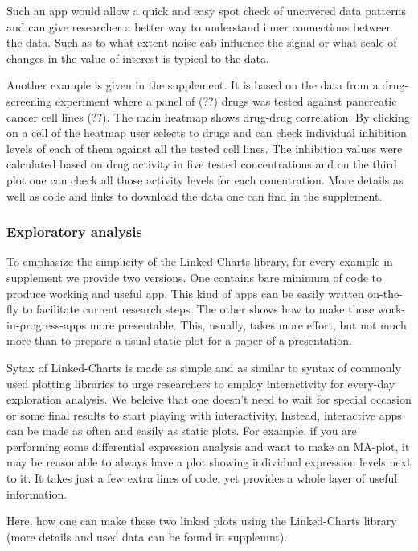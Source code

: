 \documentclass[twocolumn,10pt]{article}
\begin{document}
Such an app would allow a quick and easy spot check of uncovered data patterns and can give researcher a better way to understand inner connections between the data. Such as to what extent noise cab influence the signal or what scale of changes in the value of interest is typical to the data.

Another example is given in the supplement. It is based on the data from a drug-screening experiment where a panel of (??) drugs was tested against pancreatic cancer cell lines (??). The main heatmap shows drug-drug correlation. By clicking on a cell of the heatmap user selects to drugs and can check individual inhibition levels of each of them against all the tested cell lines. The inhibition values were calculated based on drug activity in five tested concentrations and on the third plot one can check all those activity levels for each conentration. More details as well as code and links to download the data one can find in the supplement.

\subsubsection{Exploratory analysis}
To emphasize the simplicity of the Linked-Charts library, for every example in supplement we provide two versions. One contains bare minimum of code to produce working and useful app. This kind of apps can be easily written on-the-fly to facilitate current research steps. The other shows how to make those work-in-progress-apps more presentable. This, usually, takes more effort, but not much more than to prepare a usual static plot for a paper of a presentation.

Sytax of Linked-Charts is made as simple and as similar to syntax of commonly used plotting libraries to urge researchers to employ interactivity for every-day exploration analysis. We beleive that one doesn't need to wait for special occasion or some final results to start playing with interactivity. Instead, interactive apps can be made as often and easily as static plots. For example, if you are performing some differential expression analysis and want to make an MA-plot, it may be reasonable to always have a plot showing individual expression levels next to it. It takes just a few extra lines of code, yet provides a whole layer of useful information.

Here, how one can make these two linked plots using the Linked-Charts library (more details and used data can be found in supplemnt).
\end{document}
